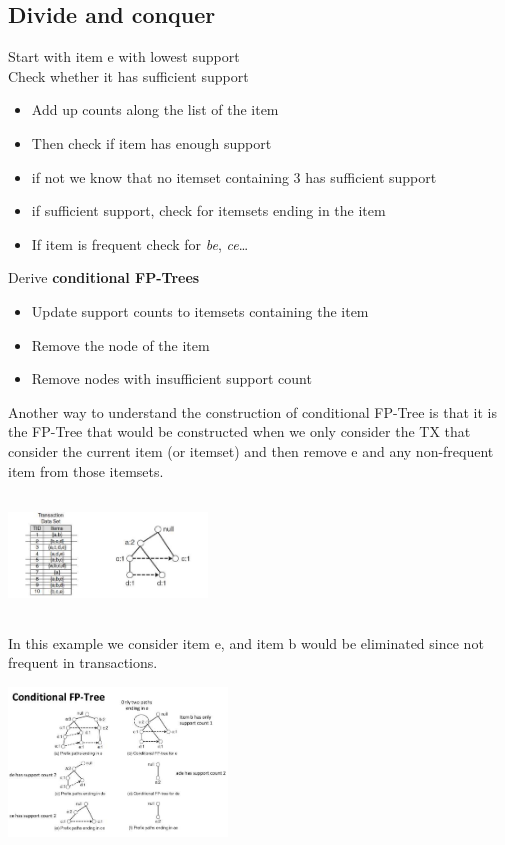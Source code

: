 \subsection{Divide and conquer}
Start with item e with lowest support \\
Check whether it has sufficient support
\begin{itemize}
\item Add up counts along the list of the item
\item Then check if item has enough support
\item if not we know that no itemset containing 3 has sufficient
  support
\item if sufficient support, check for itemsets ending in the item
  \quad \item If item is frequent check for \textit{be},
  \textit{ce}\ldots
\end{itemize}

Derive \textbf{conditional FP-Trees}
\begin{itemize}
\item Update support counts to itemsets containing the item
\item Remove the node of the item
\item Remove nodes with insufficient support count
\end{itemize}

Another way to understand the construction of conditional FP-Tree is
that it is the FP-Tree that would be constructed when we only consider
the TX that consider the current item (or itemset) and then remove e
and any non-frequent item from those itemsets.

\includegraphics[width=200px, height=120px]{condfp}

In this example we consider item e, and item b would be eliminated
since not frequent in transactions.

\includegraphics[width=220px, height=150px]{fpexample}

